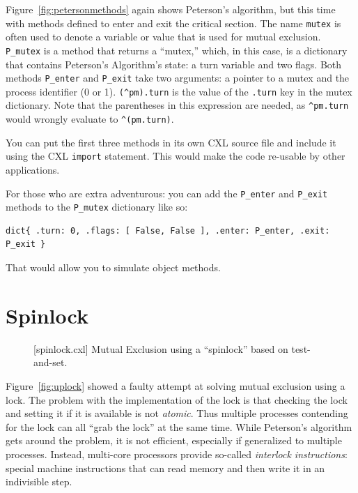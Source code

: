 \documentclass{report}
\newenvironment{code}{
\tcolorbox
}{
\endtcolorbox
}
\begin{document}
Figure~\ref{fig:petersonmethods} again shows Peterson's algorithm,
but this time with methods defined to enter and exit the critical
section.
The name \texttt{mutex} is often used to denote a variable or value
that is used for mutual exclusion.
\texttt{P\_mutex} is a method that returns a ``mutex,'' which, in this
case, is a dictionary that contains Peterson's Algorithm's state:
a turn variable and two flags.
Both methods \texttt{P\_enter} and \texttt{P\_exit} take two arguments:
a pointer to a mutex and the process identifier (0 or 1).
\texttt{(\^{}pm).turn} is the value of the \texttt{.turn} key
in the mutex dictionary.  Note that the parentheses in this expression
are needed, as \texttt{\^{}pm.turn} would wrongly evaluate to
\texttt{\^{}(pm.turn)}.

You can put the first three methods in its own CXL source file
and include it using the CXL \texttt{import} statement.
This would
make the code re-usable by other applications.

For those who are
extra adventurous: you can add the \texttt{P\_enter} and
\texttt{P\_exit} methods to the \texttt{P\_mutex} dictionary
like so:
\begin{code}
\begin{verbatim}
dict{ .turn: 0, .flags: [ False, False ], .enter: P_enter, .exit: P_exit }
\end{verbatim}
\end{code}
That would allow you to simulate object methods.

\chapter{Spinlock}
\label{ch:spinlock}

\begin{figure}
\begin{code}
\end{code}
\caption{[spinlock.cxl] Mutual Exclusion using a ``spinlock'' based on test-and-set.}
\label{fig:tas}
\end{figure}

Figure~\ref{fig:uplock} showed a faulty attempt at solving mutual
exclusion using a lock.  The problem with the implementation of the
lock is that checking the lock and setting it if it is available is
not \emph{atomic}.  Thus multiple processes contending for the lock
can all ``grab the lock'' at the same time.  While Peterson's
algorithm gets around the problem, it is not efficient, especially
if generalized to multiple processes.  Instead, multi-core processors provide
so-called \emph{interlock instructions}:
special machine instructions
that can read memory and then write it in an indivisible step.
\end{document}
